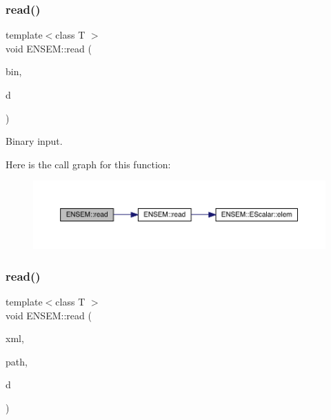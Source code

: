 \subsubsection{\texorpdfstring{read()}{read()}\hspace{0.1cm}{\footnotesize\ttfamily [1/2]}}
{\footnotesize\ttfamily template$<$class T $>$ \\
void E\+N\+S\+E\+M\+::read (\begin{DoxyParamCaption}\item[{\mbox{\hyperlink{classADATIO_1_1BinaryReader}{A\+D\+A\+T\+I\+O\+::\+Binary\+Reader}} \&}]{bin,  }\item[{\mbox{\hyperlink{classENSEM_1_1PScalar}{P\+Scalar}}$<$ T $>$ \&}]{d }\end{DoxyParamCaption})}



Binary input. 

Here is the call graph for this function\+:\nopagebreak
\begin{figure}[H]
\begin{center}
\leavevmode
\includegraphics[width=350pt]{db/dcc/group__primscalar_ga1d9173117dec6193e9c26c211973310b_cgraph}
\end{center}
\end{figure}
\mbox{\label{group__primscalar_ga882ac6046905c4b049ed86cd7668b32a}} 
\subsubsection{\texorpdfstring{read()}{read()}\hspace{0.1cm}{\footnotesize\ttfamily [2/2]}}
{\footnotesize\ttfamily template$<$class T $>$ \\
void E\+N\+S\+E\+M\+::read (\begin{DoxyParamCaption}\item[{\mbox{\hyperlink{classADATXML_1_1XMLReader}{A\+D\+A\+T\+X\+M\+L\+::\+X\+M\+L\+Reader}} \&}]{xml,  }\item[{const std\+::string \&}]{path,  }\item[{\mbox{\hyperlink{classENSEM_1_1PScalar}{P\+Scalar}}$<$ T $>$ \&}]{d }\end{DoxyParamCaption})\hspace{0.3cm}{\ttfamily [inline]}}



